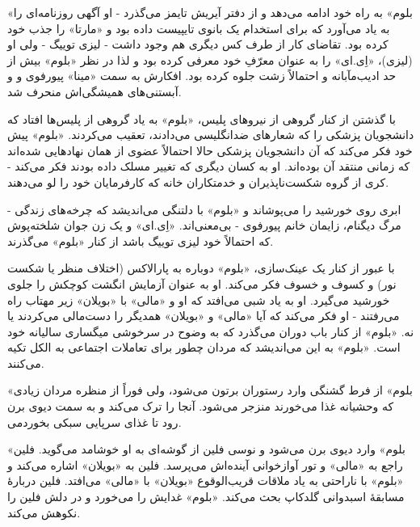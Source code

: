 \documentclass[12pt]{book}
\newcommand{\noun}[1]{«{#1}»}
\begin{document}
    \noun{بلوم} به راه خود ادامه می‌دهد و از دفتر آیریش تایمز می‌گذرد - او آگهی روزنامه‌ای را به یاد می‌آورد که برای استخدام یک بانوی تایپیست داده بود و \noun{مارتا} را جذب خود کرده بود. تقاضای کار از طرف کس دیگری هم وجود داشت - لیزی توییگ - ولی او (لیزی)، \noun{اِی.ای} را به عنوان معرّفِ خود معرفی کرده بود و لذا در نظر \noun{بلوم} بیش از حد ادیب‌مآبانه و احتمالاً زشت جلوه کرده بود. افکارش به سمت \noun{مینا} پیورفوی و و آبستنی‌های همیشگی‌اش منحرف شد.

    با گذشتن از کنار گروهی از نیروهای پلیس، \noun{بلوم} به یاد گروهی از پلیس‌ها افتاد که دانشجویان پزشکی را که شعارهای ضدانگلیسی می‌دادند، تعقیب می‌کردند. \noun{بلوم} پیش خود فکر می‌کند که آن دانشجویان پزشکی حالا احتمالاً عضوی از همان نهادهایی شده‌اند که زمانی منتقد آن بوده‌اند. او به کسان دیگری که تغییر مسلک داده بودند فکر می‌کند - کری از گروه شکست‌ناپذیران و خدمتکاران خانه که کارفرمایان خود را لو می‌دهند.

    ابری روی خورشید را می‌پوشاند و \noun{بلوم} با دلتنگی می‌اندیشد که چرخه‌های زندگی - مرگ دیگنام، زایمان خانم پیورفوی - بی‌معنی‌اند. \noun{اِی.ای} و یک زن جوان شلخته‌پوش که احتمالاً خود لیزی توییگ باشد از کنار \noun{بلوم} می‌گذرند.

    با عبور از کنار یک عینک‌سازی، \noun{بلوم} دوباره به پارالاکس (اختلاف منظر یا شکست نور) و کسوف و خسوف فکر می‌کند. او به عنوان آزمایش انگشت کوچکش را جلوی خورشید می‌گیرد. او به یاد شبی می‌افتد که او و \noun{مالی} با \noun{بویلان} زیر مهتاب راه می‌رفتند - او فکر می‌کند که آیا \noun{مالی} و \noun{بویلان} همدیگر را دست‌مالی می‌کردند یا نه. \noun{بلوم} از کنار باب دوران می‌گذرد که به وضوح در سرخوشی میگساری سالیانه خود است. \noun{بلوم} به این می‌اندیشد که مردان چطور برای تعاملات اجتماعی به الکل تکیه می‌کنند.

    \noun{بلوم} از فرط گشنگی وارد رستوران برتون می‌شود، ولی فوراً از منظره مردان زیادی که وحشیانه غذا می‌خورند منزجر می‌شود. آنجا را ترک می‌کند و به سمت دیوی برن می‎‌رود تا غذای سرپایی سبکی بخورد.

    \noun{بلوم} وارد دیوی برن می‌شود و نوسی فلین از گوشه‌ای به او خوشامد می‌گوید. فلین راجع به \noun{مالی} و تور آوازخوانی آینده‌اش می‌پرسد. فلین به \noun{بویلان} اشاره می‌کند و \noun{بلوم} با ناراحتی به یاد ملاقات قریب‌الوقوع \noun{بویلان} با \noun{مالی} می‌افتد. فلین دربارۀ مسابقۀ اسبدوانی گلدکاپ بحث می‌کند. \noun{بلوم} غدایش را می‌خورد و در دلش فلین را نکوهش می‌کند.
\end{document}
